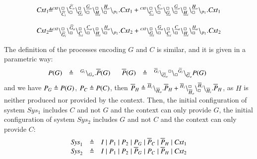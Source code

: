 \[
\begin{array}{l@{\hspace{-0.03cm}}c@{\hspace{-0.03cm}}l}
\mathit{Cxt}_1 & \defeq &\startchain{\mathit{cxt}}\chainedlink{\widehat{C}_i}{\noact}\chainedlink{\noact}{\widehat{C}_o}\chainedlink{\underline{G}_i}{\noact}\chainedlink{\noact}{\underline{G}_o}
\chainedlink{\underline{H}_i}{\noact}\chainedlink{\noact}{\underline{H}_o}\chainend{p_1}.\mathit{Cxt}_1 			                      +
                              \startchain{\mathit{cxt}}\chainedlink{\underline{C}_i}{\noact}\chainedlink{\noact}{\underline{C}_o}\chainedlink{\underline{G}_i}{\noact}\chainedlink{\noact}{\underline{G}_o}\chainedlink{\underline{H}_i}{\noact}\chainedlink{\noact}{\underline{H}_o}\chainend{p_1}.\mathit{Cxt}_1 \\
                              \\
                              \mathit{Cxt}_2 & \defeq &\startchain{\mathit{cxt}}\chainedlink{\widehat{G}_i}{\noact}\chainedlink{\noact}{\widehat{G}_o}\chainedlink{\underline{C}_i}{\noact}\chainedlink{\noact}{\underline{C}_o}\chainedlink{\underline{H}_i}{\noact}\chainedlink{\noact}{\underline{H}_o}\chainend{p_1}.\mathit{Cxt}_2 	                      +
                              \startchain{\mathit{cxt}}\chainedlink{\underline{G}_i}{\noact}\chainedlink{\noact}{\underline{G}_o}\chainedlink{\underline{C}_i}{\noact}\chainedlink{\noact}{\underline{C}_o}\chainedlink{\underline{H}_i}{\noact}\chainedlink{\noact}{\underline{H}_o}\chainend{p_1}.\mathit{Cxt}_2
\end{array}
\]

The definition of the processes encoding $G$ and $C$ is similar, and it is given in a parametric way:
\[
\begin{array}{lcl @{\hspace{0.5cm}}lcl}
P(G) &\defeq&\link{G_i}{G_o}.\overline{P}(G)\   & \overline{P}(G)&\defeq&\link{\overline{G}_i}{\overline{G}_o} \link{\noact}{\noact}\link{\widetilde{G}_i}{\widetilde{G}_o}P(G) \ \ 			                      
\end{array}
\]
and we have $P_G \triangleq P(G)$, $P_C \triangleq P(C)$,  then $\overline{P}_H \triangleq {}^{\overline{H}_i} \backslash_{\overline{H}_o}.\overline{P}_H + {}^{\overline{H}_i}\backslash_{\overline{H}_o}^{\scriptstyle {\square}}\backslash_{\scriptstyle {\square}}^{\overline{H}_i}\backslash_{\overline{H}_i}.\overline{P}_H$, as $H$ is neither produced nor provided by the context.
Then, the initial configuration of system $Sys_1$ includes $C$ and not $G$ and the context can only provide $G$,
the initial configuration of system $Sys_2$ includes $G$ and not $C$ and the context can only provide $C$:
\[
\begin{array}{lcl}
\mathit{Sys}_1 & \triangleq & I\mid  P_1 \mid P_2 \mid P_G \mid \overline{P}_C \mid \overline{P}_H\mid \mathit{Cxt}_1 \\
\mathit{Sys}_2 & \triangleq & I \mid P_1 \mid P_2 \mid \overline{P}_G \mid P_C \mid \overline{P}_H\mid \mathit{Cxt}_2\\
\end{array}
\]

